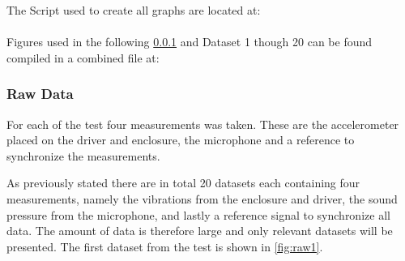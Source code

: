 The Script used to create all graphs are located at:\\
\\
Figures used in the following \ref{subsec:Raw_data_1} and Dataset 1 though 20 can be found compiled in a combined file at:


\subsubsection{Raw Data}\label{subsec:Raw_data_1}

For each of the test four measurements was taken. These are the accelerometer placed on the driver and enclosure, the microphone and a reference to synchronize the measurements. 

As previously stated there are in total 20 datasets each containing four measurements, namely the vibrations from the enclosure and driver, the sound pressure from the microphone, and lastly a reference signal to synchronize all data. The amount of data is therefore large and only relevant datasets will be presented. The first dataset from the test is shown in \autoref{fig:raw1}.


%	
%	
%	



